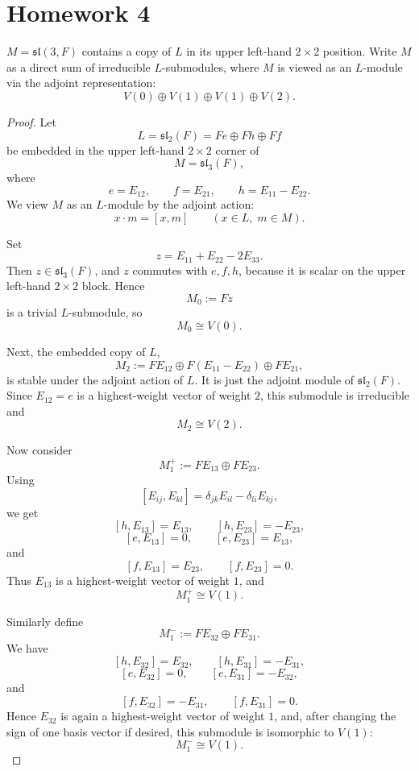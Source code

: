 \section{Homework 4}

\begin{exercise}
    [P34, Ex2] \(M=\mathfrak{sl}(3,F)\) contains a copy of \(L\) in its upper left-hand \(2\times 2\) position. Write \(M\) as a direct sum of irreducible \(L\)-submodules, where \(M\) is viewed as an \(L\)-module via the adjoint representation:
    \[
        V(0)\oplus V(1)\oplus V(1)\oplus V(2).
    \]
\end{exercise}

\begin{proof}
    Let
    \[
    L=\mathfrak{sl}_2(F)
     =
    F e\oplus Fh\oplus Ff
    \]
    be embedded in the upper left-hand \(2\times 2\) corner of
    \[
    M=\mathfrak{sl}_3(F),
    \]
    where
    \[
    e=E_{12},\qquad f=E_{21},\qquad h=E_{11}-E_{22}.
    \]
    We view \(M\) as an \(L\)-module by the adjoint action:
    \[
    x\cdot m=[x,m]\qquad (x\in L,\;m\in M).
    \]
    
    Set
    \[
    z=E_{11}+E_{22}-2E_{33}.
    \]
    Then \(z\in \mathfrak{sl}_3(F)\), and \(z\) commutes with \(e,f,h\), because
    it is scalar on the upper left-hand \(2\times 2\) block. Hence
    \[
    M_0:=Fz
    \]
    is a trivial \(L\)-submodule, so
    \[
    M_0\cong V(0).
    \]
    
    Next, the embedded copy of \(L\),
    \[
    M_2:=F E_{12}\oplus F(E_{11}-E_{22})\oplus F E_{21},
    \]
    is stable under the adjoint action of \(L\). It is just the adjoint module of
    \(\mathfrak{sl}_2(F)\). Since \(E_{12}=e\) is a highest-weight vector of weight
    \(2\), this submodule is irreducible and
    \[
    M_2\cong V(2).
    \]
    
    Now consider
    \[
    M_1^+:=F E_{13}\oplus F E_{23}.
    \]
    Using
    \[
    [E_{ij},E_{kl}]=\delta_{jk}E_{il}-\delta_{li}E_{kj},
    \]
    we get
    \[
    [h,E_{13}]=E_{13},\qquad [h,E_{23}]=-E_{23},
    \]
    \[
    [e,E_{13}]=0,\qquad [e,E_{23}]=E_{13},
    \]
    and
    \[
    [f,E_{13}]=E_{23},\qquad [f,E_{23}]=0.
    \]
    Thus \(E_{13}\) is a highest-weight vector of weight \(1\), and
    \[
    M_1^+\cong V(1).
    \]
    
    Similarly define
    \[
    M_1^-:=F E_{32}\oplus F E_{31}.
    \]
    We have
    \[
    [h,E_{32}]=E_{32},\qquad [h,E_{31}]=-E_{31},
    \]
    \[
    [e,E_{32}]=0,\qquad [e,E_{31}]=-E_{32},
    \]
    and
    \[
    [f,E_{32}]=-E_{31},\qquad [f,E_{31}]=0.
    \]
    Hence \(E_{32}\) is again a highest-weight vector of weight \(1\), and,
    after changing the sign of one basis vector if desired, this submodule is
    isomorphic to \(V(1)\):
    \[
    M_1^-\cong V(1).
    \]
    

\end{proof}
